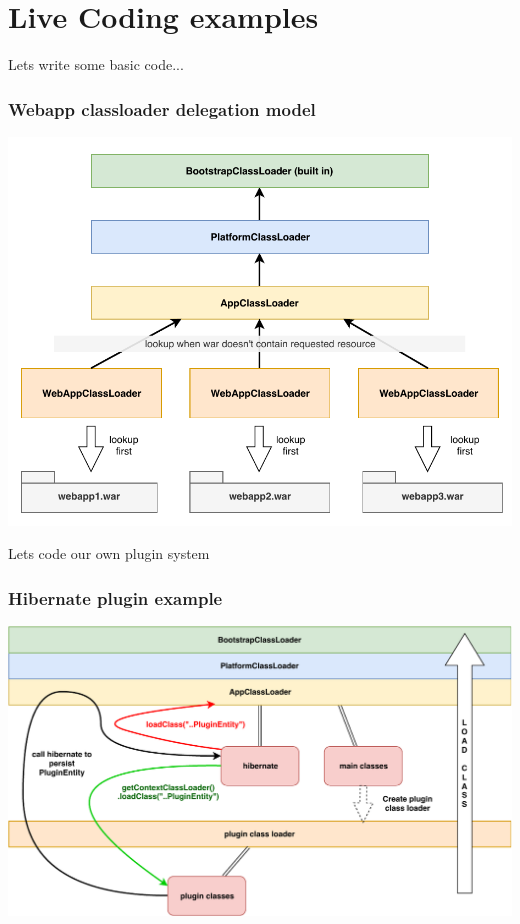 \documentclass[aspectratio=169]{beamer}
\begin{document}
\section{Live Coding examples}


\begin{frame}
    \begin{center}
    Lets write some basic code...
    \end{center}
\end{frame}

\begin{frame}
	\frametitle{Webapp classloader delegation model}
	\begin{center}
	    \includegraphics[scale=0.5]{assets/AllGraphicsTalk-webappclassloader.pdf}
	\end{center}
\end{frame}

\begin{frame}
    \begin{center}
    Lets code our own plugin system
    \end{center}
\end{frame}

\begin{frame}
	\frametitle{Hibernate plugin example}
	\begin{center}
	    \includegraphics[scale=0.5]{assets/AllGraphicsTalk-hibernate.pdf}
	\end{center}
\end{frame}
\end{document}
